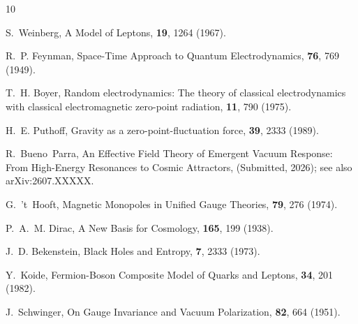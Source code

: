 \documentclass[
  reprint,
  aps,
  prd,
  twocolumn,
  superscriptaddress,
  nofootinbib,
  floatfix
]{revtex4-2}
\begin{document}
\begin{thebibliography}{10}

S.~Weinberg,
\newblock A Model of Leptons,
 {\bf 19}, 1264 (1967).

R.~P. Feynman,
\newblock Space-Time Approach to Quantum Electrodynamics,
 {\bf 76}, 769 (1949).

T.~H. Boyer,
\newblock Random electrodynamics: The theory of classical electrodynamics
  with classical electromagnetic zero-point radiation,
 {\bf 11}, 790 (1975).

H.~E. Puthoff,
\newblock Gravity as a zero-point-fluctuation force,
 {\bf 39}, 2333 (1989).

R.~Bueno~Parra,
\newblock An Effective Field Theory of Emergent Vacuum Response: From
  High-Energy Resonances to Cosmic Attractors,
 (Submitted, 2026);
  see also arXiv:2607.XXXXX.

G.~'t~Hooft,
\newblock Magnetic Monopoles in Unified Gauge Theories,
 {\bf 79}, 276 (1974).

P.~A.~M. Dirac,
\newblock A New Basis for Cosmology,
 {\bf 165}, 199 (1938).

J.~D. Bekenstein,
\newblock Black Holes and Entropy,
 {\bf 7}, 2333 (1973).

Y.~Koide,
\newblock Fermion-Boson Composite Model of Quarks and Leptons,
 {\bf 34}, 201 (1982).

J.~Schwinger,
\newblock On Gauge Invariance and Vacuum Polarization,
 {\bf 82}, 664 (1951).

\end{thebibliography}
\end{document}
